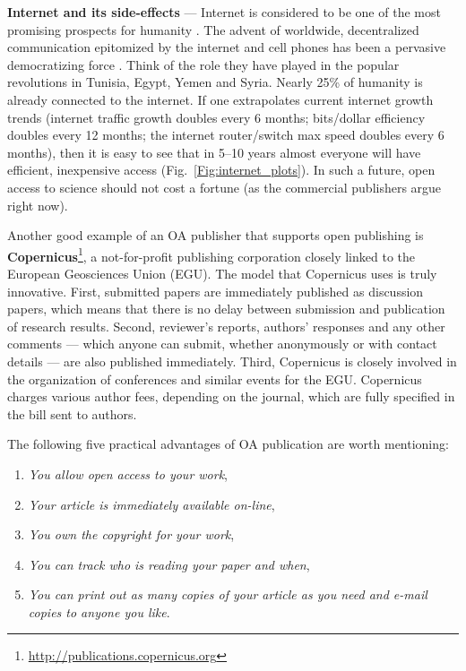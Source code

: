 \documentclass[graybox,envcountchap,sectrefs,UStrade]{svmono}
\newenvironment{fminipage}{\begin{Sbox}\begin{minipage}}{\end{minipage}\end{Sbox}\fbox{\TheSbox}}
\begin{document}
\bigskip
\begin{fminipage}{.9\textwidth}{\footnotesize{\textsf{\textbf{Internet and its side-effects}} --- Internet is considered to be one of the most promising prospects for humanity \citep{Glenn2009}. The advent of worldwide, decentralized communication epitomized by the internet and cell phones has been a pervasive democratizing force \citep{Kurzweil2005}. Think of the role they have played in the popular revolutions in Tunisia, Egypt, Yemen and Syria. Nearly 25\% of humanity is already connected to the internet. If one extrapolates current internet growth trends (internet traffic growth doubles every 6 months; bits/dollar efficiency doubles every 12 months; the internet router/switch max speed doubles every 6 months), then it is easy to see that in 5--10 years almost everyone will have efficient, inexpensive access (Fig.\@~\ref{Fig:internet_plots}). In such a future, open access to science should not cost a fortune (as the commercial publishers argue right now).
}}
\end{fminipage}
\bigskip

Another good example of an OA publisher that supports open publishing is \textbf{Copernicus}\footnote{\url{http://publications.copernicus.org}}, a not-for-profit publishing corporation closely linked to the European Geosciences Union (EGU). The model that Copernicus uses is truly innovative. First, submitted papers are immediately published as discussion papers, which means that there is no delay between submission and publication of research results. Second, reviewer's reports, authors' responses and any other comments --- which anyone can submit, whether anonymously or with contact details --- are also published immediately. Third, Copernicus is closely involved in the organization of conferences and similar events for the EGU. Copernicus charges various author fees, depending on the journal, which are fully specified in the bill sent to authors. \par

The following five practical advantages of OA publication are worth mentioning:

\begin{enumerate}\renewcommand{\labelenumi}{(\textit{\alph{enumi}})}
  \item \emph{You allow open access to your work},
  \item \emph{Your article is immediately available on-line},
  \item \emph{You own the copyright for your work},
  \item \emph{You can track who is reading your paper and when},
  \item \emph{You can print out as many copies of your article as you need and e-mail copies to anyone you like}.
\end{enumerate}
\end{document}
